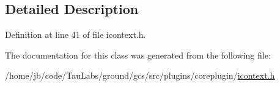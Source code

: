 \subsection{\-Detailed \-Description}


\-Definition at line 41 of file icontext.\-h.



\-The documentation for this class was generated from the following file\-:\begin{DoxyCompactItemize}
\item 
/home/jb/code/\-Tau\-Labs/ground/gcs/src/plugins/coreplugin/\hyperlink{icontext_8h}{icontext.\-h}\end{DoxyCompactItemize}
